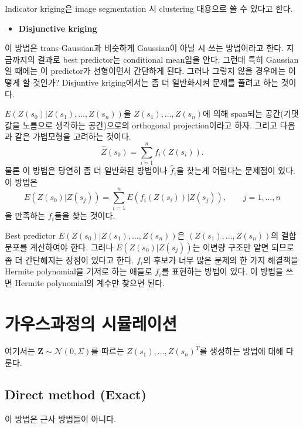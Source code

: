 \documentclass[b5paper,]{scrbook}
\providecommand{\tightlist}{%
  \setlength{\itemsep}{0pt}\setlength{\parskip}{0pt}}
\theoremstyle{plain}
\theoremstyle{definition}
\numberwithin{equation}{section}
\begin{document}
Indicator kriging은 image segmentation 시 clustering 대용으로 쓸 수 있다고 한다.

\begin{itemize}
\tightlist
\item
  \textbf{Disjunctive kriging}
\end{itemize}

이 방법은 trans-Gaussian과 비슷하게 Gaussian이 아닐 시 쓰는 방법이라고 한다. 지금까지의 결과로 best predictor는 conditional mean임을 안다. 그런데 특히 Gaussian일 때에는 이 predictor가 선형이면서 간단하게 된다. 그러나 그렇지 않을 경우에는 어떻게 할 것인가? Disjuntive kriging에서는 좀 더 일반화시켜 문제를 풀려고 하는 것이다.

\(E(Z(s_{0})|Z(s_{1}),\ldots , Z(s_{n}))\)을 \(Z(s_{1}), \ldots, Z(s_{n})\)에 의해 span되는 공간(기댓값을 노름으로 생각하는 공간)으로의 orthogonal projection이라고 하자. 그리고 다음과 같은 가법모형을 고려하는 것이다.
\[\hat{Z}(s_{0})=\sum_{i=1}^{n}f_{i}(Z(s_{i})).\]
물론 이 방법은 당연히 좀 더 일반화된 방법이나 \(\hat{f}_{i}\)을 찾는게 어렵다는 문제점이 있다. 이 방법은
\[E(Z(s_{0})|Z(s_{j}))=\sum_{i=1}^{n}E(f_{i}(Z(s_{i}))|Z(s_{j})), \qquad{j=1,\ldots, n}\]
을 만족하는 \(f_{i}\)들을 찾는 것이다.

Best predictor \(E(Z(s_{0})|Z(s_{1}),\ldots ,Z(s_{n}))\)은 \((Z(s_{1}),\ldots ,Z(s_{n}))\)의 결합분포를 계산하여야 한다. 그러나 \(E(Z(s_{0})|Z(s_{j}))\)는 이변량 구조만 알면 되므로 좀 더 간단해지는 장점이 있다고 한다. \(f_{i}\)의 후보가 너무 많은 문제의 한 가지 해결책을 Hermite polynomial을 기저로 하는 애들로 \(f_{i}\)를 표현하는 방법이 있다. 이 방법을 쓰면 Hermite polynomial의 계수만 찾으면 된다.

\hypertarget{simGaussian}{%
\chapter{가우스과정의 시뮬레이션}\label{simGaussian}}

여기서는 \(\mathbf{Z}\sim \mathcal{N}(0,\Sigma)\)를 따르는 \(Z(s_{1}),\ldots, Z(s_{n})^{T}\)를 생성하는 방법에 대해 다룬다.

\hypertarget{direct-method-exact}{%
\section{Direct method (Exact)}\label{direct-method-exact}}

이 방법은 근사 방법들이 아니다.
\end{document}
